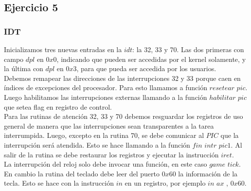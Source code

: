 \subsection{Ejercicio 5}

\subsubsection{IDT}
Inicializamos tres nuevas entradas en la $idt$: la 32, 33 y 70. Las dos primeras con campo $dpl$ en $0x0$, indicando que pueden ser accedidas por el kernel solamente, y la última con $dpl$ en $0x3$, para que pueda
ser accedida por los usuarios.\\
Debemos remapear las direcciones de las interrupciones 32 y 33 porque caen en índices de excepciones del
procesador. Para esto llamamos a función $resetear$ $pic$. Luego habilitamos las interrupciones externas 
llamando a la función $habilitar$ $pic$ que setea flag en registro de control.\\
Para las rutinas de atención 32, 33 y 70 debemos resguardar los registros de uso general de manera que 
las interrupciones sean transparentes a la tarea interrumpida. Luego, excepto en la rutina 70, se debe comunicar al $PIC$ que la interrupción
 será atendida. Esto se hace llamando a la función $fin$ $intr$ $pic1$. Al salir de la rutina se debe restaurar
los registros y ejecutar la instrucción $iret$.\\
La interrupción del reloj solo debe invocar una función, en este caso $game$ $tick$. En cambio la rutina 
del teclado debe leer del puerto $0x60$ la información de la tecla. Esto se hace con la instrucción $in$ en un
registro, por ejemplo $in$ $ax$ , $0x60$.

